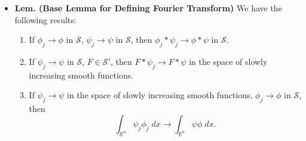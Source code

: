 \documentclass{article}
\begin{document}
\begin{itemize}
	\begin{solutions}
		Let $N \in \mathbb{Z}_{\geq 0}$, $k \in \mathbb{Z}_{\geq 0}$. Then 
			\begin{align}
				\begin{split}
					(1 + |x|)^{N}\abs{D^{k}(\psi \phi_{j} - \psi \phi)}	 &\leq C (1 + |x|)^{N} \cdot \sum_{\ell = 0}^{k}|D^{\ell}\psi|\cdot |D^{k - \ell}(\phi_{j} - \phi)| \qquad (\text{by the Leibniz Product Rule}) \\
					&\leq C'(1 + |x|)^{N} \cdot \sum_{\ell= 0}^{k}(1 + |x|)^{N_{\ell}}\abs{D^{k - \ell}(\phi_{j} - \phi)}. 
				\end{split}
			\end{align}
		Hence, since $\phi_{j} \to \phi$ in $\mathbb{R}^{n}$, by tsking the supremum of both sides and taking the limit $j \to \infty$, we see that the above equation tends to zero. Hence, $\psi\phi_{j} \to \psi \phi$ in $\mathcal{S}$. Now, fix some $F \in \mathcal{S}'$, and some slowly increasing smooth function $\psi$. Linearity follows immediately by construction. Next let $\phi_{j}, \phi \in \mathcal{S}$ so that $\phi_{j} \to \phi$ in $\mathcal{S}$. Then since $\psi \phi_{j} \to \psi \phi$, where $\psi\phi \in \mathcal{S}$, 
			\begin{equation}
				\psi F(\phi_{j}) = F(\psi \phi_{j}) \xrightarrow{j \to \infty} F(\psi \phi) = \psi F(\phi). 
			\end{equation}
		This proves continuity. Therefore, $\psi F \in \mathcal{S}'$. 
	\end{solutions}
	
	\item \textbf{Lem. (Base Lemma for Defining Fourier Transform)} We have the following results: \vspace{-0.25cm}
		\begin{enumerate}[itemsep=-2pt,label = (\arabic{*})]
			\item If $\phi_{j} \to \phi$ in $\mathcal{S}$, $\psi_{j} \to \psi$ in $\mathcal{S}$, then $\phi_{j} \ast \psi_{j} \to \phi \ast \psi$ in $\mathcal{S}$. 
			\item If $\psi_{j} \to \psi$ in $\mathcal{S}$, $F \in \mathcal{S}'$, then $F \ast \psi_{j} \to F \ast \psi$ in the space of slowly increasing smooth functions. 
			\item If $\psi_{j} \to \psi$ in the space of slowly increasing smooth functions, $\phi_{j} \to \phi$ in $\mathcal{S}$, then 
				\begin{equation}
					\int_{\mathbb{R}^{n}}\psi_{j}\phi_{j}\;dx\longrightarrow \int_{\mathbb{R}^{n}}\psi\phi\;dx. 
				\end{equation}
		\end{enumerate}
	

\end{itemize}
\end{document}
